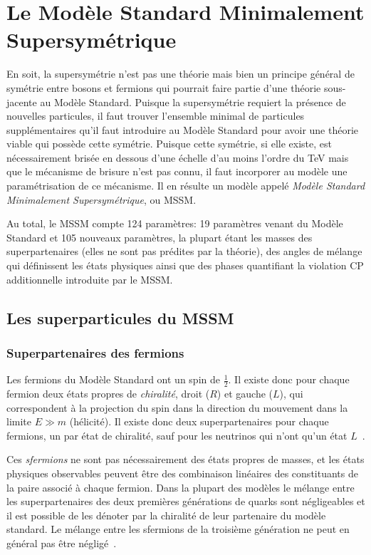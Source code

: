 \section{Le Modèle Standard Minimalement Supersymétrique}
\label{sec:susy:mssm}

En soit, la supersymétrie n'est pas une théorie mais bien un principe
général de symétrie entre bosons et fermions qui pourrait faire partie
d'une théorie sous-jacente au Modèle Standard. Puisque la
supersymétrie requiert la présence de nouvelles particules, il faut
trouver l'ensemble minimal de particules supplémentaires qu'il faut
introduire au Modèle Standard pour avoir une théorie viable qui
possède cette symétrie. Puisque cette symétrie, si elle existe, est
nécessairement brisée en dessous d'une échelle d'au moins l'ordre du
TeV mais que le mécanisme de brisure n'est pas connu, il faut
incorporer au modèle une paramétrisation de ce mécanisme. Il en
résulte un modèle appelé \emph{Modèle Standard Minimalement
  Supersymétrique}, ou MSSM.

Au total, le MSSM compte 124 paramètres: 19 paramètres venant du
Modèle Standard et 105 nouveaux paramètres, la plupart étant les
masses des superpartenaires (elles ne sont pas prédites par la
théorie), des angles de mélange qui définissent les états physiques
ainsi que des phases quantifiant la violation CP additionnelle
introduite par le MSSM.

\subsection{Les superparticules du MSSM}
\label{sec:susy:mssm:sparticules}

\subsubsection{Superpartenaires des fermions}

Les fermions du Modèle Standard ont un spin de $\frac{1}{2}$. Il
existe donc pour chaque fermion deux états propres de
\emph{chiralité}, droit ($R$) et gauche ($L$), qui correspondent à la
projection du spin dans la direction du mouvement dans la limite
$E \gg m$ (hélicité). Il existe donc deux superpartenaires pour chaque
fermions, un par état de chiralité, sauf pour les neutrinos qui n'ont
qu'un état $L$~\cite{thomson_modern_2013}.

Ces \emph{sfermions} ne sont pas nécessairement des états propres de
masses, et les états physiques observables peuvent être des
combinaison linéaires des constituants de la paire associé à chaque
fermion. Dans la plupart des modèles le mélange entre les
superpartenaires des deux premières générations de quarks sont
négligeables et il est possible de les dénoter par la chiralité de leur
partenaire du modèle standard. Le mélange entre les sfermions de la
troisième génération ne peut en général pas être
négligé~\cite{aad_summary_2015}. 

